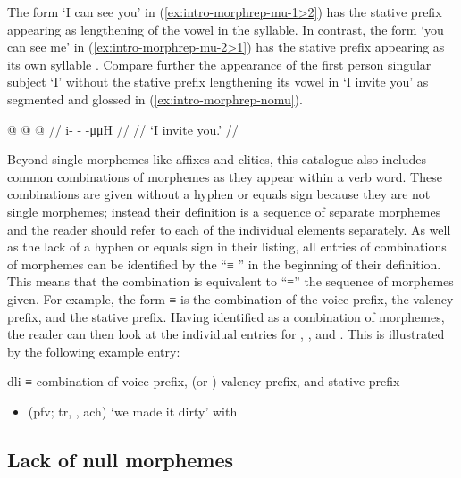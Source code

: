 The form  ‘I can see you’ in (\ref{ex:intro-morphrep-mu-1>2}) has the stative prefix appearing as lengthening of the vowel in the  syllable.
In contrast, the form  ‘you can see me’ in (\ref{ex:intro-morphrep-mu-2>1}) has the stative prefix appearing as its own syllable .
Compare further the appearance of the first person singular subject  ‘I’ without the stative prefix lengthening its vowel in  ‘I invite you’ as segmented and glossed in (\ref{ex:intro-morphrep-nomu}).

\ex\label{ex:intro-morphrep-nomu}%
\begingl
	\gla	{} @ {} @ {} @ {} //
	\glb	i- -  -μμH //
	\glc	{}\· \·  \· //
	\glft	‘I invite you.’
		//
\endgl
\xe

Beyond single morphemes like affixes and clitics, this catalogue also includes common combinations of morphemes as they appear within a verb word.
These combinations are given without a hyphen or equals sign because they are not single morphemes; instead their definition is a sequence of separate morphemes and the reader should refer to each of the individual elements separately.
As well as the lack of a hyphen or equals sign in their listing, all entries of combinations of morphemes can be identified by the “≡ ” in the beginning of their definition.
This means that the combination is equivalent to “≡” the sequence of morphemes given.
For example, the form  ≡  is the combination of the  voice prefix, the  valency prefix, and the  stative prefix.
Having identified  as a combination of morphemes, the reader can then look at the individual entries for , , and .
This is illustrated by the following example entry:

\begin{morphdesc}
\item[dli]
	≡ 
	combination of  voice prefix,
		 (or ) valency prefix,
		and  stative prefix
	\begin{itemize}
	\item	{} (pfv; tr, , ach) ‘we made it dirty’ with 
	\end{itemize}
\end{morphdesc}

\subsection{Lack of null morphemes}\label{sec:intro-null}

